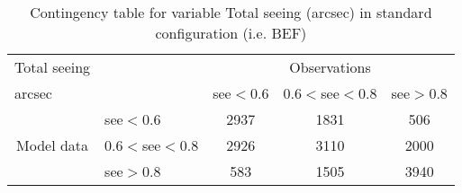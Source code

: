 
\begin{table}[]
\begin{center}
\begin{tabular}{llccc}
\hline
{Total seeing}                                       &                                                    & \multicolumn{3}{c}{Observations}                 \\
{arcsec}                                       &                             & see$<0.6$   & $0.6<$see$<0.8$ & see$>0.8$ \\
\hline
\multicolumn{1}{c}{\multirow{3}{*}{Model data}}  & see$<0.6$          & 2937                & 1831                       & 506              \\
                                                 & $0.6<$see$<0.8$ & 2926                & 3110                       & 2000              \\
                                                 & see$>0.8$          & 583                & 1505                       & 3940              \\
\hline
\end{tabular}
\end{center}
\caption{Contingency table for variable Total seeing (arcsec) in standard configuration (i.e. BEF)}
\label{tab:contingency}
\end{table}
